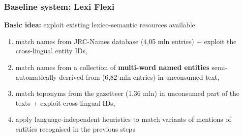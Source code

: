 \documentclass{beamer}
\begin{document}
\begin{frame}[fragile]
 \frametitle{Baseline system: Lexi Flexi}

\textbf{Basic idea:} exploit existing lexico-semantic resources available

\begin{enumerate}

\item match names from {\color{red}JRC-Names} database (4,05 mln entries) + exploit the cross-lingual entity IDs,

\vspace{0.2cm}

\item match names from a collection of \textbf{multi-word named entities} semi-automatically derrived from {\color{red}{\sc Babelnet}} (6,82 mln entries) in unconsumed text,

\vspace{0.2cm}

\item match toponyms from the {\color{red}{\sc GeoNames}} gazetteer (1,36 mln) in unconsumed part of the texts + exploit cross-lingual IDs,

\vspace{0.2cm}

\item apply language-independent heuristics to match variants of mentions of entities recognised in the previous steps

\end{enumerate}

\end{frame}
\end{document}
